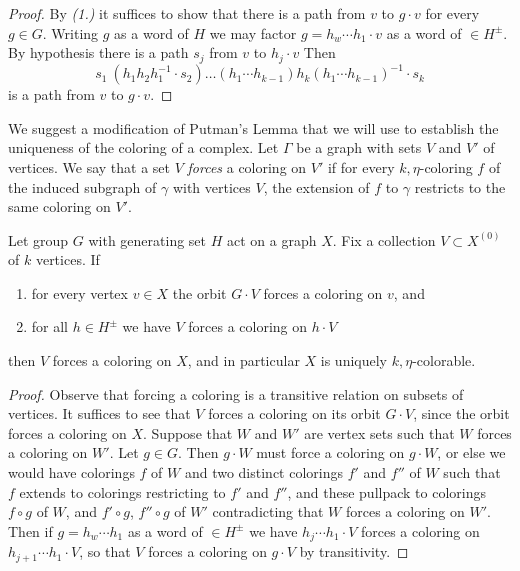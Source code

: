 \begin{proof}
  By \emph{(1.)} it suffices to show that there is a path from $v$ to $g \cdot v$ for every $g \in G$.
  Writing $g$ as a word of $H$ we may factor $g= h_w \cdots h_1 \cdot v$ as a word of $\in H^{\pm}$.
  By hypothesis there is a path $s_j$ from  $ v$ to $ h_j \cdot v$
  Then
  $$
  s_1 \  (h_1h_2h_1^{-1} \cdot s_2)  \ldots (h_1 \cdots h_{k-1}) h_k (h_1 \cdots h_{k-1})^{-1} \cdot s_k
  $$
  is a path from $v$ to $g\cdot v$.
\end{proof}

We suggest a modification of Putman's Lemma that we will use to establish the uniqueness of the coloring of a complex.
Let $\Gamma$ be a graph with sets $V$ and $V'$ of vertices.
We say that a set $V$ \emph{forces} a coloring on $V'$ if for every $k,\eta$-coloring
$f$ of the induced subgraph of $\gamma$ with vertices $V$,
the extension of $f$ to $\gamma$ restricts to the same coloring on $V'$.

\begin{lemma}
  \label{putmancolor}
  Let group $G$ with generating set $H$ act on a graph $X$.
  Fix a collection $V \subset X^{(0)}$ of $k$ vertices.
  If
  \begin{enumerate}
  \item for every vertex $v \in X$ the orbit $G \cdot V$ forces a coloring on $v$, and
  \item for all $h \in H^{\pm}$ we have $V$ forces a coloring on $h\cdot V$
  \end{enumerate}
  then $V$ forces a coloring on $X$,
  and in particular $X$ is uniquely $k,\eta$-colorable.
\end{lemma}

\begin{proof}
  Observe that forcing a coloring is a transitive relation on subsets of vertices.
  It suffices to see that $V$ forces a coloring on its orbit $G\cdot V$, since the orbit forces a coloring on $X$.
  Suppose that $W$ and $W'$ are vertex sets such that $W$ forces a coloring on $W'$.
  Let $g \in G$.
  Then $g \cdot W$ must force a coloring on $g \cdot W$, or else we would have colorings
  $f$ of $W$ and two distinct colorings $f'$ and $f''$ of $W$ such that $f$ extends to colorings restricting to $f'$ and $f''$, and these pullpack to colorings $f \circ g$ of $W$, and $f'\circ g$, $f''\circ g$ of $W'$ contradicting that $W$ forces a coloring on $W'$.
  Then if $g= h_w \cdots h_1$ as a word of $\in H^{\pm}$
  we have $h_j \cdots h_1 \cdot V$ forces a coloring on $h_{j+1} \cdots h_1 \cdot V$,
  so that $V$ forces a coloring on $g \cdot V$ by transitivity.
\end{proof}



